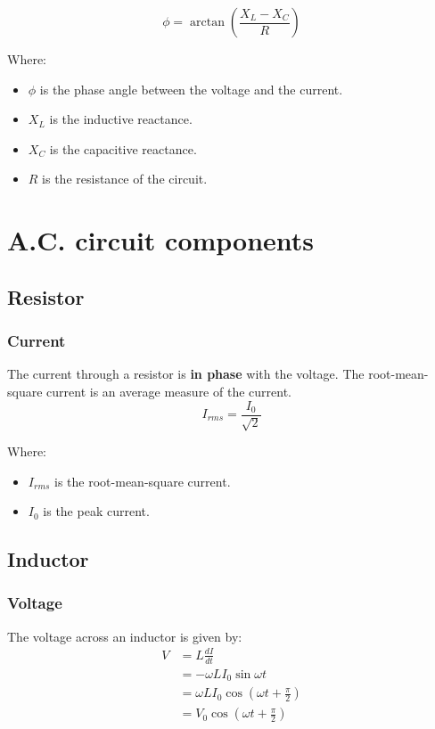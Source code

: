 \documentclass[11pt]{article}
\begin{document}
\[\phi = \arctan \left(\frac{X_L - X_C}{R} \right)\]

Where:
\begin{itemize}
\item \(\phi\) is the phase angle between the voltage and the current.
\item \(X_L\) is the inductive reactance.
\item \(X_C\) is the capacitive reactance.
\item \(R\) is the resistance of the circuit.
\end{itemize}
\section{A.C. circuit components}
\label{sec:org8a6fbe1}

\subsection{Resistor}
\label{sec:org64a1092}

\subsubsection{Current}
\label{sec:org81408a2}
The current through a resistor is \textbf{in phase} with the voltage. The root-mean-square current is an average measure of the current.
\[I_{rms} = \frac{I_0}{\sqrt{2}}\]

Where:
\begin{itemize}
\item \(I_{rms}\) is the root-mean-square current.
\item \(I_0\) is the peak current.
\end{itemize}
\subsection{Inductor}
\label{sec:org579c38b}

\subsubsection{Voltage}
\label{sec:org710e270}
The voltage across an inductor is given by:
\begin{align*}
V &= L\frac{dI}{dt} \\
&= - \omega L I_0 \sin \omega t \\
&= \omega L I_0 \cos \left(\omega t + \frac{\pi}{2} \right) \\
&= V_0 \cos \left(\omega t + \frac{\pi}{2} \right)
\end{align*}
\end{document}
